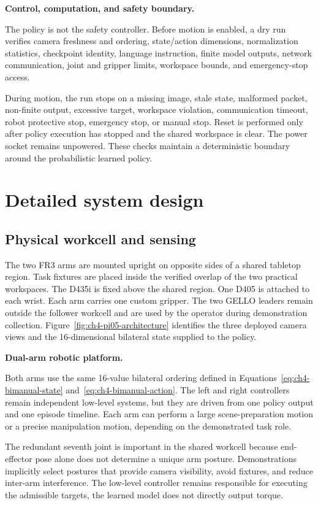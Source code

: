 \medskip
\noindent\textbf{Control, computation, and safety boundary.}

The policy is not the safety controller. Before motion is enabled, a dry run verifies camera freshness and ordering, state/action dimensions, normalization statistics, checkpoint identity, language instruction, finite model outputs, network communication, joint and gripper limits, workspace bounds, and emergency-stop access.

During motion, the run stops on a missing image, stale state, malformed packet, non-finite output, excessive target, workspace violation, communication timeout, robot protective stop, emergency stop, or manual stop. Reset is performed only after policy execution has stopped and the shared workspace is clear. The power socket remains unpowered. These checks maintain a deterministic boundary around the probabilistic learned policy.

\section{Detailed system design}

\subsection{Physical workcell and sensing}

The two FR3 arms are mounted upright on opposite sides of a shared tabletop region. Task fixtures are placed inside the verified overlap of the two practical workspaces. The D435i is fixed above the shared region. One D405 is attached to each wrist. Each arm carries one custom gripper. The two GELLO leaders remain outside the follower workcell and are used by the operator during demonstration collection. Figure~\ref{fig:ch4-pi05-architecture} identifies the three deployed camera views and the 16-dimensional bilateral state supplied to the policy.

\medskip
\noindent\textbf{Dual-arm robotic platform.}

Both arms use the same 16-value bilateral ordering defined in Equations~\ref{eq:ch4-bimanual-state} and~\ref{eq:ch4-bimanual-action}. The left and right controllers remain independent low-level systems, but they are driven from one policy output and one episode timeline. Each arm can perform a large scene-preparation motion or a precise manipulation motion, depending on the demonstrated task role.

The redundant seventh joint is important in the shared workcell because end-effector pose alone does not determine a unique arm posture. Demonstrations implicitly select postures that provide camera visibility, avoid fixtures, and reduce inter-arm interference. The low-level controller remains responsible for executing the admissible targets, the learned model does not directly output torque.

